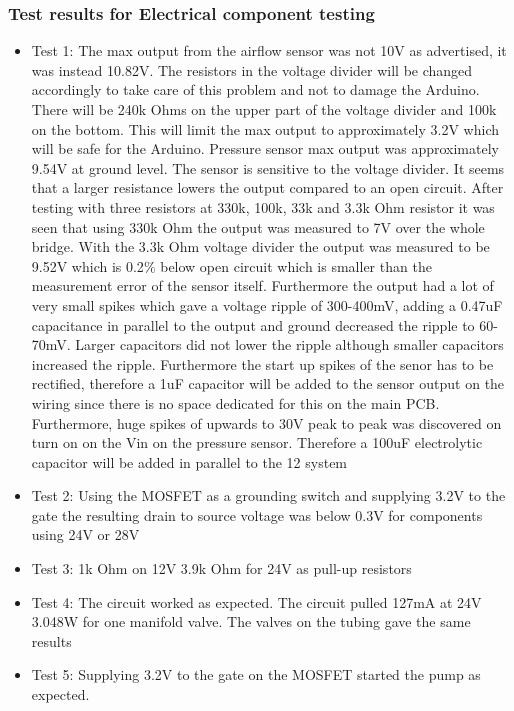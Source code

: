 \documentclass[a4paper,12pt,oneside]{article}
\begin{document}
\begin{appendices}
\subsubsection{Test results for Electrical component testing}
\label{sec:Test-Results-Electrical-Component-Testing}
\begin{itemize}
\item Test 1: The max output from the airflow sensor was not 10V as advertised, it was instead 10.82V.  The resistors in the voltage divider will be changed accordingly to take care of this problem and not to damage the Arduino. There will be 240k Ohms on the upper part of the voltage divider and 100k on the bottom. This will limit the max output to approximately 3.2V which will be safe for the Arduino. Pressure sensor max output was approximately 9.54V at ground level. The sensor is sensitive to the voltage divider. It seems that a larger resistance lowers the output compared to an open circuit. After testing with three resistors at 330k, 100k, 33k and 3.3k Ohm resistor it was seen that using 330k Ohm the output was measured to 7V over the whole bridge. With the 3.3k Ohm voltage divider the output was measured to be 9.52V which is 0.2$\%$ below open circuit which is smaller than the measurement error of the sensor itself. Furthermore the output had a lot of very small spikes which gave a voltage ripple of 300-400mV, adding a 0.47uF capacitance in parallel to the output and ground decreased the ripple to 60-70mV. Larger capacitors did not lower the ripple although smaller capacitors increased the ripple. Furthermore the start up spikes of the senor has to be rectified, therefore a 1uF capacitor will be added to the sensor output on the wiring since there is no space dedicated for this on the main PCB. Furthermore, huge spikes of upwards to 30V peak to peak was discovered on turn on on the Vin on the pressure sensor. Therefore a 100uF electrolytic capacitor will be added in parallel to the 12 system
\item Test 2: Using the MOSFET as a grounding switch and supplying 3.2V to the gate the resulting drain to source voltage was below 0.3V for components using 24V or 28V
\item Test 3: 1k Ohm on 12V  3.9k Ohm for 24V as pull-up resistors
\item Test 4: The circuit worked as expected. The circuit pulled 127mA at 24V 3.048W for one manifold valve. The valves on the tubing gave the same results
\item Test 5: Supplying 3.2V to the gate on the MOSFET started the pump as expected.

\end{itemize}
\end{appendices}
\end{document}
